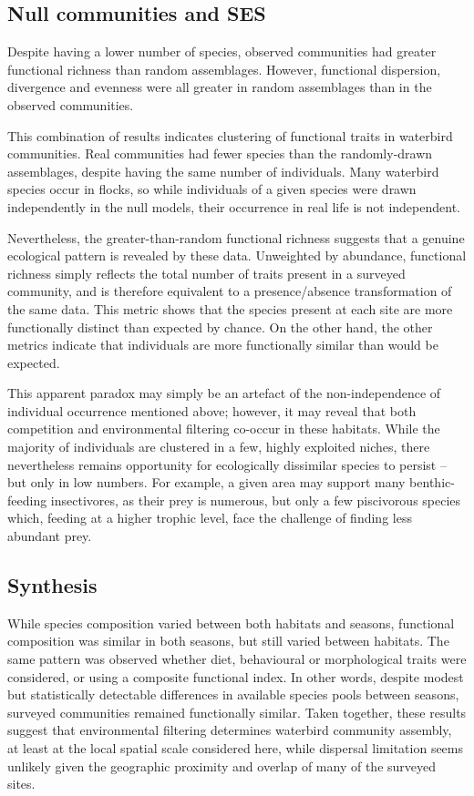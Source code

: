 \documentclass[12pt,a4paper]{book}
\begin{document}
\subsection{Null communities and SES}

Despite having a lower number of species, observed communities had greater functional richness than random assemblages. However, functional dispersion, divergence and evenness were all greater in random assemblages than in the observed communities.

This combination of results indicates clustering of functional traits in waterbird communities. Real communities had fewer species than the randomly-drawn assemblages, despite having the same number of individuals. Many waterbird species occur in flocks, so while individuals of a given species were drawn independently in the null models, their occurrence in real life is not independent. 

Nevertheless, the greater-than-random functional richness suggests that a genuine ecological pattern is revealed by these data. Unweighted by abundance, functional richness simply reflects the total number of traits present in a surveyed community, and is therefore equivalent to a presence/absence transformation of the same data. This metric shows that the species present at each site are more functionally distinct than expected by chance. On the other hand, the other metrics indicate that individuals are more functionally similar than would be expected. 

This apparent paradox may simply be an artefact of the non-independence of individual occurrence mentioned above; however, it may reveal that both competition and environmental filtering co-occur in these habitats. While the majority of individuals are clustered in a few, highly exploited niches, there nevertheless remains opportunity for ecologically dissimilar species to persist -- but only in low numbers. For example, a given area may support many benthic-feeding insectivores, as their prey is numerous, but only a few piscivorous species which, feeding at a higher trophic level, face the challenge of finding less abundant prey. 

\subsection{Synthesis}

While species composition varied between both habitats and seasons, functional composition was similar in both seasons, but still varied between habitats. The same pattern was observed whether diet, behavioural or morphological traits were considered, or using a composite functional index. In other words, despite modest but statistically detectable differences in available species pools between seasons, surveyed communities remained functionally similar. Taken together, these results suggest that environmental filtering determines waterbird community assembly, at least at the local spatial scale considered here, while dispersal limitation seems unlikely given the geographic proximity and overlap of many of the surveyed sites.
\end{document}
